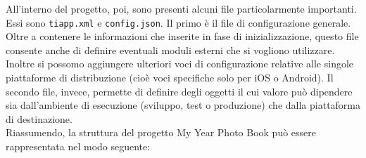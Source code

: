 				All'interno del progetto, poi, sono presenti alcuni file particolarmente importanti. Essi sono \texttt{tiapp.xml} e
				\texttt{config.json}. Il primo è il file di configurazione generale. Oltre a contenere le informazioni che inserite
				in fase di inizializzazione, questo file consente anche di definire eventuali moduli esterni che si vogliono
				utilizzare. Inoltre si possomo aggiungere ulteriori voci di configurazione relative alle singole piattaforme di
				distribuzione (cioè voci specifiche solo per iOS o Android). Il secondo file, invece, permette di definire degli
				oggetti il cui valore può dipendere sia dall'ambiente di esecuzione (sviluppo, test o produzione) che dalla
				piattaforma di destinazione.\\
				Riassumendo, la struttura del progetto My Year Photo Book può essere rappresentata nel modo seguente:
